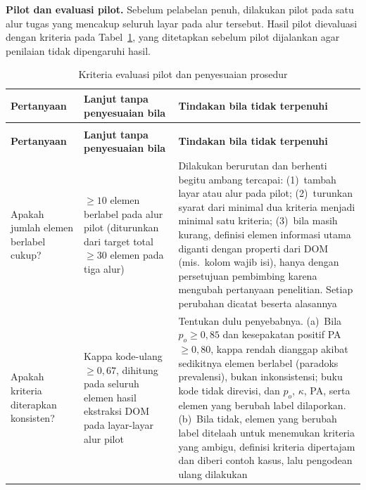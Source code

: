 \textbf{Pilot dan evaluasi pilot.} Sebelum pelabelan penuh, dilakukan pilot pada satu alur tugas yang mencakup seluruh layar pada alur tersebut. Hasil pilot dievaluasi dengan kriteria pada Tabel~\ref{tab:evaluasi-pilot}, yang ditetapkan sebelum pilot dijalankan agar penilaian tidak dipengaruhi hasil.

\begin{longtable}{>{\raggedright\arraybackslash}p{}>{\raggedright\arraybackslash}p{}>{\raggedright\arraybackslash}p{}}
\caption{Kriteria evaluasi pilot dan penyesuaian prosedur}
\label{tab:evaluasi-pilot}\\
\hline
\textbf{Pertanyaan} & \textbf{Lanjut tanpa penyesuaian bila} & \textbf{Tindakan bila tidak terpenuhi} \\
\hline
\endfirsthead
\multicolumn{3}{l}{\emph{Tabel~\ref{tab:evaluasi-pilot} (lanjutan)}}\\
\hline
\textbf{Pertanyaan} & \textbf{Lanjut tanpa penyesuaian bila} & \textbf{Tindakan bila tidak terpenuhi} \\
\hline
\endhead
\hline
\endfoot
Apakah jumlah elemen berlabel cukup? & $\geq 10$ elemen berlabel pada alur pilot (diturunkan dari target total $\geq 30$ elemen pada tiga alur) & Dilakukan berurutan dan berhenti begitu ambang tercapai: (1)~tambah layar atau alur pada pilot; (2)~turunkan syarat dari minimal dua kriteria menjadi minimal satu kriteria; (3)~bila masih kurang, definisi elemen informasi utama diganti dengan properti dari DOM (mis.\ kolom wajib isi), hanya dengan persetujuan pembimbing karena mengubah pertanyaan penelitian. Setiap perubahan dicatat beserta alasannya \\
\hline
Apakah kriteria diterapkan konsisten? & Kappa kode-ulang $\geq 0{,}67$, dihitung pada seluruh elemen hasil ekstraksi DOM pada layar-layar alur pilot & Tentukan dulu penyebabnya. (a)~Bila $p_o \geq 0{,}85$ dan kesepakatan positif PA $\geq 0{,}80$, kappa rendah dianggap akibat sedikitnya elemen berlabel (paradoks prevalensi), bukan inkonsistensi; buku kode tidak direvisi, dan $p_o$, $\kappa$, PA, serta elemen yang berubah label dilaporkan. (b)~Bila tidak, elemen yang berubah label ditelaah untuk menemukan kriteria yang ambigu, definisi kriteria dipertajam dan diberi contoh kasus, lalu pengodean ulang dilakukan \\

\end{longtable}
